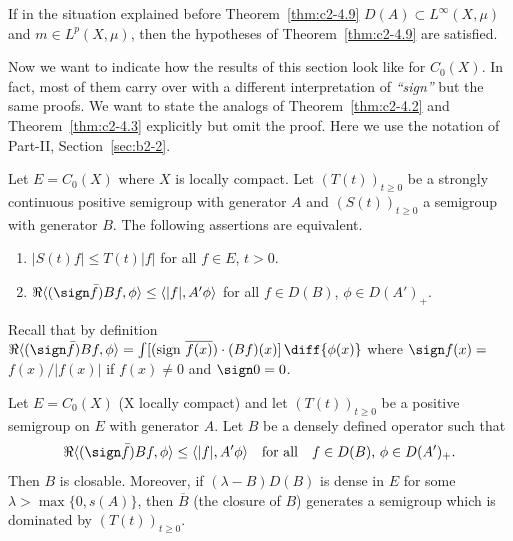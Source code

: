 \begin{example}\label{ex:c2-4.11}
If in the situation explained before Theorem~\ref{thm:c2-4.9}  
$D(A) \subset L^{\infty}(X,\mu)$ and $m \in L^{p}(X,\mu)$, then the hypotheses of Theorem~\ref{thm:c2-4.9}   are satisfied.
\end{example}
Now we want to indicate how the results of this section look like for $C_{0}(X)$.
In fact, most of them carry over with a different interpretation of \emph{``sign''} but the same proofs.
We want to state the analogs of Theorem~\ref{thm:c2-4.2}   and Theorem~\ref{thm:c2-4.3}   explicitly but omit the proof.
Here we use the notation of Part-II, Section~\ref{sec:b2-2}.
\begin{theorem}\label{thm:c2-4.12}
Let $E = C_{0}(X)$ where $X$ is locally compact.
Let $(T(t))_{t \geq 0}$ be a strongly continuous positive semigroup with
generator $A$ and $(S(t))_{t \geq 0}$ a semigroup with generator $B$.
The following assertions are equivalent.
\begin{enumerate}[\upshape (a)]
\item \label{thm:c2-4.12-1}
$|S(t)f| \leq T(t)|f|$ for all $f \in E$, $t > 0$.
\item \label{thm:c2-4.12-2}
$\Re\langle(\sign  \bar{f})Bf,\phi\rangle \leq \langle|f|,A'\phi\rangle$ for all $f \in D(B)$, $\phi \in D(A')_{+}$.
\end{enumerate}
\end{theorem}
Recall that by definition
$\Re  \langle(\sign  \bar{f})Bf,\phi\rangle = \int [\text{(sign } \overline{f(x)})\cdot(Bf)(x)] \, \diff{\phi(x)}$ where $\sign  f(x) =$
$f(x)/|f(x)|$ if\/ $f(x) \neq 0$ and $\sign  0 = 0$.
\begin{theorem}\label{thm:c2-4.13}
Let $E = C_{0}(X)$ (X locally compact) and let $(T(t))_{t \geq 0}$
be a positive semigroup on $E$ with generator $A$.
Let $B$ be a densely defined operator such that
\begin{equation}\label{eq:c2-4.12}
\Re  \langle(\sign  \bar{f})Bf,\phi\rangle \leq \langle|f|,A'\phi\rangle \quad 
\text{for all} \quad f \in D(B),\, \phi \in D(A')_{+}.
\end{equation}
Then $B$ is closable.
Moreover, if\/ $(\lambda - B)D(B)$ is dense in $E$ for some $\lambda > \max\{0,s(A)\}$, then $\overline{B}$ (the closure of\/ $B$) generates a
semigroup which is dominated by $(T(t))_{t \geq 0}$.
\end{theorem}
